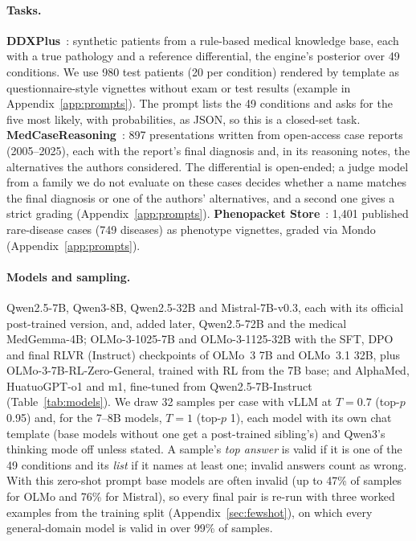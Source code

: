 \documentclass[wcp]{jmlr}
\begin{document}
\paragraph{Tasks.}
\textbf{DDXPlus}~\citep{fansi2022ddxplus}: synthetic patients from a rule-based medical knowledge base, each with a true pathology and a reference differential, the engine's posterior over 49 conditions. We use 980 test patients (20 per condition) rendered by template as questionnaire-style vignettes without exam or test results (example in Appendix~\ref{app:prompts}). The prompt lists the 49 conditions and asks for the five most likely, with probabilities, as JSON, so this is a closed-set task.
\textbf{MedCaseReasoning}~\citep{wu2025medcasereasoning}: 897 presentations written from open-access case reports (2005--2025), each with the report's final diagnosis and, in its reasoning notes, the alternatives the authors considered. The differential is open-ended; a judge model from a family we do not evaluate on these cases decides whether a name matches the final diagnosis or one of the authors' alternatives, and a second one gives a strict grading (Appendix~\ref{app:prompts}).
\textbf{Phenopacket Store}~\citep{danis2025phenopacketstore}: 1,401 published rare-disease cases (749 diseases) as phenotype vignettes, graded via Mondo (Appendix~\ref{app:prompts}).

\paragraph{Models and sampling.}
Qwen2.5-7B, Qwen3-8B, Qwen2.5-32B and Mistral-7B-v0.3, each with its official post-trained version, and, added later, Qwen2.5-72B and the medical Med\-Gemma-4B; OLMo-3-1025-7B and OLMo-3-1125-32B with the SFT, DPO and final RLVR (Instruct) checkpoints of OLMo~3 7B and OLMo~3.1 32B, plus OLMo-3-7B-RL-Zero-General, trained with RL from the 7B base; and AlphaMed, HuatuoGPT-o1 and m1, fine-tuned from Qwen2.5-7B-Instruct (Table~\ref{tab:models}). We draw 32 samples per case with vLLM at $T{=}0.7$ (top-$p$ 0.95) and, for the 7--8B models, $T{=}1$ (top-$p$ 1), each model with its own chat template (base models without one get a post-trained sibling's) and Qwen3's thinking mode off unless stated. A sample's \emph{top answer} is valid if it is one of the 49 conditions and its \emph{list} if it names at least one; invalid answers count as wrong. With this zero-shot prompt base models are often invalid (up to 47\% of samples for OLMo and 76\% for Mistral), so every final pair is re-run with three worked examples from the training split (Appendix~\ref{sec:fewshot}), on which every general-domain model is valid in over 99\% of samples.
\end{document}
